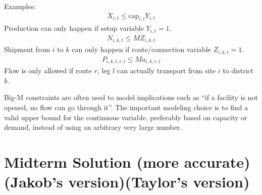 \documentclass[10pt]{article}
\begin{document}
Examples: 
\begin{gather*}
    X_{i,t} \le \text{cap}_{i,t}Y_{i,t}
\end{gather*}
Production can only happen if setup variable $Y_{i,t}=1$.
\begin{gather*}
    N_{i,k,t} \le M Z_{i,k,t}
\end{gather*}
Shipment from $i$ to $k$ can only happen if route/connection variable $Z_{i,k,t}=1$.
\begin{gather*}
    P_{i,k,t,r,l} \le M a_{i,k,r,l}
\end{gather*}
Flow is only allowed if route $r$, leg $l$ can actually transport from site $i$ to district $k$.

Big-M constraints are often used to model implications such as ``if a facility is not opened, no flow can go through it''. The important modeling choice is to find a valid upper bound for the continuous variable, preferably based on capacity or demand, instead of using an arbitrary very large number.


\newpage
\section{Midterm Solution (more accurate)(Jakob's version)(Taylor's version)}
\end{document}
